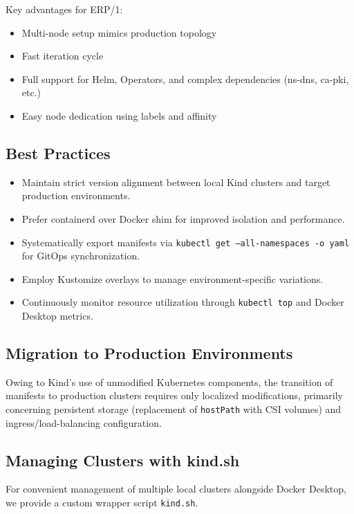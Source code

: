 \documentclass{article}
\begin{document}
Key advantages for ERP/1:

\begin{itemize}
\item Multi-node setup mimics production topology
\item Fast iteration cycle
\item Full support for Helm, Operators, and complex dependencies (ns-dns, ca-pki, etc.)
\item Easy node dedication using labels and affinity
\end{itemize}

\subsection{Best Practices}

\begin{itemize}
    \item Maintain strict version alignment between local Kind clusters and target production environments.
    \item Prefer containerd over Docker shim for improved isolation and performance.
    \item Systematically export manifests via \texttt{kubectl get --all-namespaces -o yaml} for GitOps synchronization.
    \item Employ Kustomize overlays to manage environment-specific variations.
    \item Continuously monitor resource utilization through \texttt{kubectl top} and Docker Desktop metrics.
\end{itemize}

\subsection{Migration to Production Environments}

Owing to Kind's use of unmodified Kubernetes components, the transition of manifests
to production clusters requires only localized modifications, primarily concerning
persistent storage (replacement of \texttt{hostPath} with CSI volumes) and
ingress/load-balancing configuration.

\subsection{Managing Clusters with kind.sh}

For convenient management of multiple local clusters alongside Docker Desktop,
we provide a custom wrapper script \texttt{kind.sh}.
\end{document}
